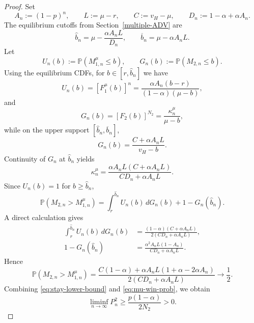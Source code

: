 \documentclass[11pt]{article}
\theoremstyle{plain}
\theoremstyle{definition}
\theoremstyle{plain}
\theoremstyle{plain}
\theoremstyle{plain}
\theoremstyle{plain}
\numberwithin{equation}{section}
\begin{document}
\begin{proof}
\noindent Set
\begin{equation*}
    A_n := (1-p)^n, \qquad L := \mu-r, \qquad C := v_H-\mu, \qquad D_n := 1-\alpha+\alpha A_n.
\end{equation*}
The equilibrium cutoffs from Section~\ref{multiple-ADV} are
\begin{equation*}
    \hat{b}_n = \mu - \frac{\alpha A_n L}{D_n}, \qquad \overline{b}_n = \mu - \alpha A_n L.
\end{equation*}
Let
\begin{equation*}
    U_n(b) := \mathbb{P}(M_{1,n}^{\mu} \leq b), \qquad G_n(b) := \mathbb{P}(M_{2,n} \leq b).
\end{equation*}
Using the equilibrium CDFs, for $b \in [r,\hat{b}_n]$ we have
\begin{equation*}
    U_n(b) = \left[F_1^{\mu}(b)\right]^n = \frac{\alpha A_n (b-r)}{(1-\alpha)(\mu-b)},
\end{equation*}
and
\begin{equation*}
    G_n(b) = \left[F_2(b)\right]^{N_2} = \frac{\kappa_n^{\mu}}{\mu-b},
\end{equation*}
while on the upper support $[\hat{b}_n,\overline{b}_n]$,
\begin{equation*}
    G_n(b) = \frac{C+\alpha A_n L}{v_H-b}.
\end{equation*}
Continuity of $G_n$ at $\hat{b}_n$ yields
\begin{equation*}
    \kappa_n^{\mu} = \frac{\alpha A_n L(C+\alpha A_n L)}{C D_n + \alpha A_n L}.
\end{equation*}
Since $U_n(b)=1$ for $b \geq \hat{b}_n$,
\begin{equation*}
    \mathbb{P}(M_{2,n} > M_{1,n}^{\mu}) = \int_{r}^{\hat{b}_n} U_n(b)\, dG_n(b) + 1-G_n(\hat{b}_n).
\end{equation*}
A direct calculation gives
\begin{align*}
    \int_{r}^{\hat{b}_n} U_n(b)\, dG_n(b) &= \frac{(1-\alpha)(C+\alpha A_n L)}{2(C D_n + \alpha A_n L)}, \\[5pt]
    1-G_n(\hat{b}_n) &= \frac{\alpha^2 A_n L(1-A_n)}{C D_n + \alpha A_n L}.
\end{align*}
Hence
\begin{equation}\label{eq:mu-win-prob}
    \mathbb{P}(M_{2,n} > M_{1,n}^{\mu}) = \frac{C(1-\alpha)+\alpha A_nL(1+\alpha-2\alpha A_n)}{2(C D_n + \alpha A_n L)} \longrightarrow \frac{1}{2}.
\end{equation}
Combining \eqref{eq:stay-lower-bound} and \eqref{eq:mu-win-prob}, we obtain
\begin{equation*}
    \liminf_{n\to\infty} P_n^{2} \geq \frac{p(1-\alpha)}{2N_2} > 0.
\end{equation*}


\end{proof}
\end{document}
